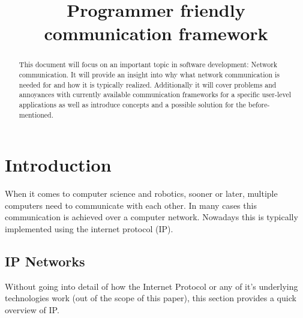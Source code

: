 \documentclass[conference]{IEEEtran}
\begin{document}
\title{Programmer friendly communication framework}

\author{
    \and
}

\maketitle

\begin{abstract}
    This document will focus on an important topic in software development: Network communication. It will provide an insight into why what network communication is needed for and how it is typically realized. Additionally it will cover problems and annoyances with currently available communication frameworks for a specific user-level applications as well as introduce concepts and a possible solution for the before-mentioned. 
\end{abstract}

\section{Introduction}

When it comes to computer science and robotics, sooner or later, multiple computers need to communicate with each other. In many cases this communication is achieved over a computer network. Nowadays this is typically implemented using the internet protocol (IP).

\subsection{IP Networks}

Without going into detail of how the Internet Protocol or any of it's underlying technologies work (out of the scope of this paper), this section provides a quick overview of IP.
\end{document}

